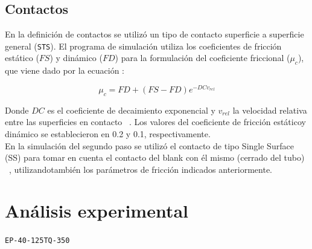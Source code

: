 \subsection{Contactos}

En la definición de contactos se utilizó un tipo de contacto superficie a superficie
general (\texttt{STS}). El programa de simulación utiliza los coeficientes de fricción 
estático ($FS$) y dinámico ($FD$) para la formulación del coeficiente friccional ($\mu_c$),
que viene dado por la ecuación :

\begin{equation}
\mu_c = FD + (FS - FD) e^{-DCv_{rel}}
\label{eq:frictional_coeff}
\end{equation}

Donde $DC$ es el coeficiente de decaimiento exponencial y $v_{rel}$ la velocidad relativa
entre las superficies en contacto ~\cite{lsdyna-manual}. Los valores del coeficiente de 
fricción estáticoy dinámico se establecieron en 0.2 y 0.1, respectivamente. ~\cite{carvill1993} \\

En la simulación del segundo paso se utilizó el contacto de tipo Single Surface (SS) para 
tomar en cuenta el contacto del blank con él mismo (cerrado del tubo) ~\cite{lsdyna-manual}, 
utilizandotambién los parámetros de fricción indicados anteriormente.

\section{Análisis experimental}

\texttt{EP-40-125TQ-350} 



